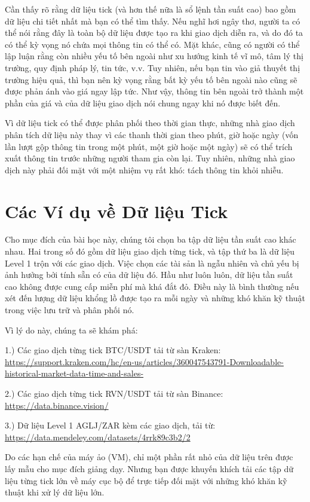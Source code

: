 Cần thấy rõ rằng dữ liệu tick (và hơn thế nữa là sổ lệnh tần suất cao) bao gồm dữ liệu chi tiết nhất mà bạn có thể tìm thấy. Nếu nghĩ hơi ngây thơ, người ta có thể nói rằng đây là toàn bộ dữ liệu được tạo ra khi giao dịch diễn ra, và do đó ta có thể kỳ vọng nó chứa mọi thông tin có thể có. Mặt khác, cũng có người có thể lập luận rằng còn nhiều yếu tố bên ngoài như xu hướng kinh tế vĩ mô, tâm lý thị trường, quy định pháp lý, tin tức, v.v. Tuy nhiên, nếu bạn tin vào giả thuyết thị trường hiệu quả, thì bạn nên kỳ vọng rằng bất kỳ yếu tố bên ngoài nào cũng sẽ được phản ánh vào giá ngay lập tức. Như vậy, thông tin bên ngoài trở thành một phần của giá và của dữ liệu giao dịch nói chung ngay khi nó được biết đến.

Vì dữ liệu tick có thể được phân phối theo thời gian thực, những nhà giao dịch phân tích dữ liệu này thay vì các thanh thời gian theo phút, giờ hoặc ngày (vốn lần lượt gộp thông tin trong một phút, một giờ hoặc một ngày) sẽ có thể trích xuất thông tin trước những người tham gia còn lại. Tuy nhiên, những nhà giao dịch này phải đối mặt với một nhiệm vụ rất khó: tách thông tin khỏi nhiễu.

\section{Các Ví dụ về Dữ liệu Tick}

Cho mục đích của bài học này, chúng tôi chọn ba tập dữ liệu tần suất cao khác nhau. Hai trong số đó gồm dữ liệu giao dịch từng tick, và tập thứ ba là dữ liệu Level 1 trộn với các giao dịch. Việc chọn các tài sản là ngẫu nhiên và chủ yếu bị ảnh hưởng bởi tính sẵn có của dữ liệu đó. Hầu như luôn luôn, dữ liệu tần suất cao không được cung cấp miễn phí mà khá đắt đỏ. Điều này là bình thường nếu xét đến lượng dữ liệu khổng lồ được tạo ra mỗi ngày và những khó khăn kỹ thuật trong việc lưu trữ và phân phối nó.

Vì lý do này, chúng ta sẽ khám phá:

1.) Các giao dịch từng tick BTC/USDT tải từ sàn Kraken: \url{https://support.kraken.com/hc/en-us/articles/360047543791-Downloadable-historical-market-data-time-and-sales-}

2.) Các giao dịch từng tick RVN/USDT tải từ sàn Binance: \url{https://data.binance.vision/}

3.) Dữ liệu Level 1 AGLJ/ZAR kèm các giao dịch, tải từ: \url{https://data.mendeley.com/datasets/4rrk89c3b2/2}

Do các hạn chế của máy ảo (VM), chỉ một phần rất nhỏ của dữ liệu trên được lấy mẫu cho mục đích giảng dạy. Nhưng bạn được khuyến khích tải các tập dữ liệu từng tick lớn về máy cục bộ để trực tiếp đối mặt với những khó khăn kỹ thuật khi xử lý dữ liệu lớn.


